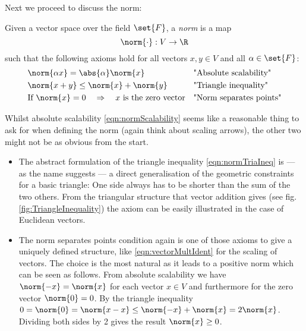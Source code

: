 \noindent
Next we proceed to discuss the norm:
\begin{defn}
	Given a vector space over the field $\set{F}$, a \emph{norm} is a map
	\[ \norm{\cdot} : V \to \R \]
	such that the following axioms hold for all vectors $x,y \in V$ and all $\alpha \in \set{F}$:
	\begin{align} 
		\label{eqn:normScalability}  &\norm{\alpha x} = \abs{\alpha} \norm{x} &&                           \text{"Absolute scalability"} \\
		\label{eqn:normTriaIneq}     &\norm{x + y} \le \norm{x} + \norm{y}    &&                           \text{"Triangle inequality"} \\
		\label{eqn:normPointSep}     &\text{If}~\norm{x} = 0 \quad \Rightarrow \quad \text{$x$ is the zero vector} &&  \text{"Norm separates points"}
	\end{align}
\end{defn}

\begin{rem}
	Whilst absolute scalability \eqref{eqn:normScalability} seems like a reasonable thing to ask for when defining the norm (again think about scaling arrows), the other two might not be as obvious from the start.
	\begin{itemize}
		\item The abstract formulation of the triangle inequality \eqref{eqn:normTriaIneq} is --- as the name suggests --- a direct generalisation of the geometric constraints for a basic triangle:
			One side always has to be shorter than the sum of the two others. 
			From the triangular structure that vector addition gives (see fig. \vref{fig:TriangleInequality}) the axiom can be easily illustrated in the case of Euclidean vectors.
		\item The norm separates points condition again is one of those axioms to give a uniquely defined structure, like \eqref{eqn:vectorMultIdent} for the scaling of vectors.
			The choice is the most natural as it leads to a positive norm which can be seen as follows.
			From absolute scalability we have $\norm{-x} = \norm{x}$ for each vector $x \in V$ and furthermore for the zero vector $\norm{0} = 0$.
			By the triangle inequality $0 = \norm{0} = \norm{x-x} \le \norm{-x} + \norm{x} = 2 \norm{x}$. 
			Dividing both sides by 2 gives the result $\norm{x} \ge 0$.
	\end{itemize}
\end{rem}


